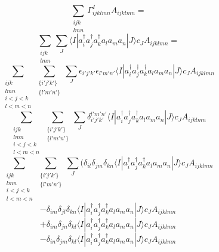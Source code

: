 \documentclass[12pt]{article}
\begin{document}
\begin{equation}
\sum_{\substack{ ijk \\ lmn}}\Gamma^{I}_{ijklmn}A_{ijklmn}  =  
\end{equation}
\begin{equation}
\sum_{\substack{ ijk \\ lmn}} \sum_{J}
 \langle I | a^{\dagger}_{i}  a^{\dagger}_{j}a^{\dagger}_{k}  a_{l}  a_{m}a_{n}| J \rangle c_{J} A_{ijklmn}  =  
\end{equation}
\begin{equation}
\sum_{\substack{ ijk \\ lmn \\ i<j<k \\  l<m<n }}
\sum_{\substack{ \{i'j'k'\} \\ \{l'm'n'\} }}
\sum_{J}
\epsilon_{i'j'k'}
\epsilon_{l'm'n'}
\langle I | a^{\dagger}_{i}  a^{\dagger}_{j}a^{\dagger}_{k}  a_{l}  a_{m}a_{n}| J \rangle c_{J}   A_{ijklmn}
\end{equation}
\begin{equation}
\sum_{\substack{ ijk \\ lmn \\ i<j<k \\  l<m<n }}
\sum_{\substack{ \{i'j'k'\} \\ \{l'm'n'\} }}
\sum_{J}
\delta_{i'j'k'}^{l'm'n'}   
\langle I | a^{\dagger}_{i}  a^{\dagger}_{j}a^{\dagger}_{k}  a_{l}  a_{m}a_{n}| J \rangle c_{J}   A_{ijklmn}
\end{equation}
\begin{equation*}
\sum_{\substack{ ijk \\ lmn \\ i<j<k \\  l<m<n }}
\sum_{\substack{ \{i'j'k'\} \\ \{l'm'n'\} }}
\sum_{J}
(\delta_{il}\delta_{jm}\delta_{kn}
\langle I | a^{\dagger}_{i}  a^{\dagger}_{j}a^{\dagger}_{k}  a_{l}  a_{m}a_{n}| J \rangle c_{J}   A_{ijklmn}
\end{equation*}
\begin{equation*}
-\delta_{im}\delta_{jl}\delta_{kn}
\langle I | a^{\dagger}_{i}  a^{\dagger}_{j}a^{\dagger}_{k}  a_{l}  a_{m}a_{n}| J \rangle c_{J}   A_{ijklmn}
\end{equation*}
\begin{equation*}
+\delta_{im}\delta_{jn}\delta_{kl}
\langle I | a^{\dagger}_{i}  a^{\dagger}_{j}a^{\dagger}_{k}  a_{l}  a_{m}a_{n}| J \rangle c_{J}   A_{ijklmn}
\end{equation*}
\begin{equation*}
-\delta_{in}\delta_{jm}\delta_{kl}
\langle I | a^{\dagger}_{i}  a^{\dagger}_{j}a^{\dagger}_{k}  a_{l}  a_{m}a_{n}| J \rangle c_{J}   A_{ijklmn}
\end{equation*}
\end{document}
